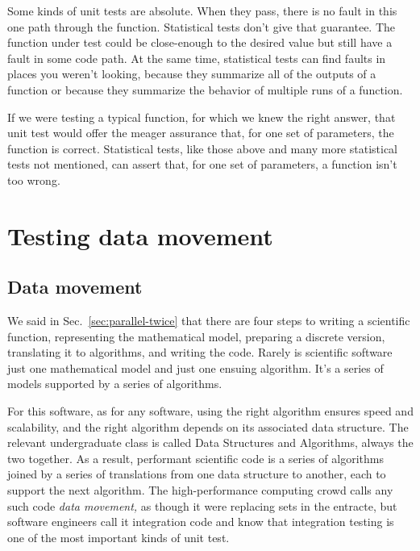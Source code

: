 \documentclass[fleqn,10pt]{olplainarticle}
\begin{document}
Some kinds of unit tests are absolute. When they pass,
there is no fault in this one path through the function.
Statistical tests don't give that guarantee. The function
under test could be close-enough to the desired value but
still have a fault in some code path.
At the same time, statistical tests can find faults
in places you weren't looking, because they summarize all
of the outputs of a function or because they summarize
the behavior of multiple runs of a function.

If we were testing a typical function, for which we knew the
right answer, that unit test would offer the meager assurance that,
for one set of parameters, the function is correct.
Statistical tests, like those above and many more statistical
tests not mentioned, can assert that, for one set of parameters,
a function isn't too wrong.





\section{Testing data movement}\label{sec:data-movement}

\subsection{Data movement}\label{sec:movement-movement}

We said in Sec.~\ref{sec:parallel-twice} that there are four
steps to writing a scientific function, representing the mathematical model,
preparing a discrete version, translating it to algorithms,
and writing the code.
Rarely is scientific software just one mathematical model
and just one ensuing algorithm. It's a series of models supported
by a series of algorithms.

For this software, as for any software, using the right algorithm
ensures speed and scalability, and the right algorithm depends on
its associated data structure. The relevant undergraduate class
is called Data Structures and Algorithms, always the two together.
As a result, performant scientific code is a series of algorithms
joined by a series of translations from one data structure to
another, each to support the next algorithm. The high-performance
computing crowd calls any such code \emph{data movement,} as though
it were replacing sets in the entracte,
but software engineers call it integration code and know that
integration testing is one of the most important kinds of unit test.
\end{document}
